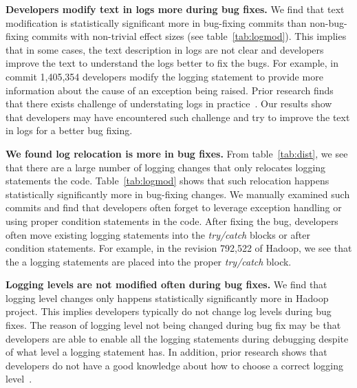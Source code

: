 \textbf{Developers modify text in logs more during bug fixes.} We find that text modification is statistically significant more in bug-fixing commits than non-bug-fixing commits with non-trivial effect sizes (see table~\ref{tab:logmod}). This implies that in some cases, the text description in logs are not clear and developers improve the text to understand the logs better to fix the bugs. For example, in commit 1,405,354  developers modify the logging statement to provide more information about the cause of an exception being raised. Prior research finds that there exists challenge of understating logs in practice~\cite{IanIcesm}. Our results show that developers may have encountered such challenge and try to improve the text in logs for a better bug fixing. 
%

\textbf{We found log relocation is more in bug fixes.} From table~\ref{tab:dist}, we see that there are a large number of logging changes that only relocates logging statements the code. Table~\ref{tab:logmod} shows that such relocation happens statistically significantly more in bug-fixing changes. We manually examined such commits and find that developers often forget to leverage exception handling or using proper condition statements in the code. After fixing the bug, developers often move existing logging statements into the \emph{try/catch} blocks or after condition statements. For example, in the revision 792,522 of Hadoop, we see that the a logging statements are placed into the proper \emph{try/catch} block.

\textbf{Logging levels are not modified often during bug fixes.} We find that logging level changes only happens statistically significantly more in Hadoop project. This implies developers typically do not change log levels during bug fixes. The reason of logging level not being changed during bug fix may be that developers are able to enable all the logging statements during debugging despite of what level a logging statement has. In addition, prior research shows that developers do not have a good knowledge about how to choose a correct logging level~\cite{Characterizinglogs}. 

